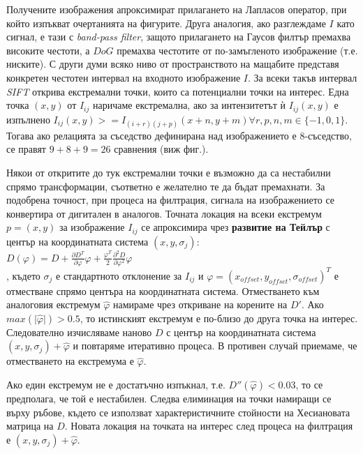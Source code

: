 \documentclass[a4paper,12pt]{article}
\begin{document}
\bigbreak

Получените изображения апроксимират прилагането на Лапласов оператор, при който изпъкват очертанията на фигурите. Друга аналогия, ако разглеждаме $I$ като сигнал, е тази с \textit{band-pass filter}, защото прилагането на Гаусов филтър премахва високите честоти, а $DoG$ премахва честотите от по-замъгленото изображение (т.е. ниските). С други думи всяко ниво от пространството на мащабите представя конкретен честотен интервал на входното изображение $I$. За всеки такъв интервал \textit{SIFT} открива екстремални точки, които са потенциални точки на интерес. Една точка $(x, y)$ от $I_{ij}$ наричаме екстремална, ако за интензитетът ѝ $I_{ij}(x, y)$ е изпълнено $I_{ij}(x, y) >= I_{(i+r)(j+p)}(x+n, y+m) \forall r,p,n,m \in \{-1, 0, 1\}$. Тогава ако релацията за съседство дефинирана над изображението е $8$-съседство, се правят $9+8+9=26$ сравнения (виж фиг.).

\bigbreak

Някои от откритите до тук екстремални точки е възможно да са нестабилни спрямо трансформации, съответно е желателно те да бъдат премахнати. За подобрена точност, при процеса на филтрация, сигнала на изображението се конвертира от дигитален в аналогов. Точната локация на всеки екстремум $p=(x, y)$ за изображение $I_{ij}$ се апроксимира чрез \textbf{развитие на Тейлър} с център на координатната система $(x, y, \sigma_j)$: \\

$D(\varphi) = D + \frac{\partial D^T}{\partial \varphi}\varphi + \frac{\varphi^T}{2}\frac{\partial^2 D}{\partial \varphi^2}\varphi$ \\

, където $\sigma_j$ е стандартното отклонение за $I_{ij}$ и $\varphi=(x_{offset},y_{offset},\sigma_{offset})^T$ е отместване спрямо центъра на координатната система. Отместването към аналоговия екстремум $\hat{\varphi}$ намираме чрез откриване на корените на $D'$. Ако $max(\lvert\hat{\varphi}\rvert) > 0.5$, то истинският екстремум е по-близо до друга точка на интерес. Следователно изчисляваме наново $D$ с център на координатната система $(x, y, \sigma_j) + \hat{\varphi}$ и повтаряме итеративно процеса. В противен случай приемаме, че отместването на екстремума е $\hat{\varphi}$.

\bigbreak

Ако един екстремум не е достатъчно изпъкнал, т.е. $D''(\hat{\varphi}) < 0.03$, то се предполага, че той е нестабилен. Следва елиминация на точки намиращи се върху ръбове, където се използват характеристичните стойности на Хесиановата матрица на $D$. Новата локация на точката на интерес след процеса на филтрация е $(x, y, \sigma_j) + \hat{\varphi}$.
\end{document}
